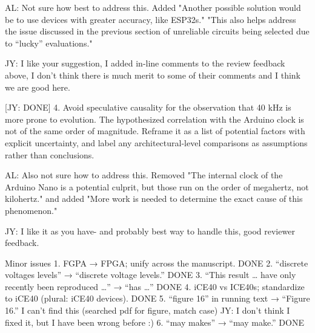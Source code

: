 AL: Not sure how best to address this. Added "Another possible solution would be to use devices with greater accuracy, like ESP32s." "This also helps address the issue discussed in the previous section of unreliable circuits being selected due to ``lucky'' evaluations."

JY: I like your suggestion, I added in-line comments to the review feedback above, I don't think there is much merit to some of their comments and I think we are good here.


[JY: DONE]
4. Avoid speculative causality for the observation that 40 kHz is more prone to evolution. The hypothesized correlation with the Arduino clock is not of the same order of magnitude. Reframe it as a list of potential factors with explicit uncertainty, and label any architectural-level comparisons as assumptions rather than conclusions.

AL: Also not sure how to address this. Removed "The internal clock of the Arduino Nano is a potential culprit, but those run on the order of megahertz, not kilohertz." and added "More work is needed to determine the exact cause of this phenomenon."

JY: I like it as you have- and probably best way to handle this, good reviewer feedback.

Minor issues
1. FGPA → FPGA; unify across the manuscript. DONE
2. “discrete voltages levels” → “discrete voltage levels.” DONE
3. “This result … have only recently been reproduced …” → “has …” DONE
4. iCE40 vs ICE40s; standardize to iCE40 (plural: iCE40 devices). DONE
5. “figure 16” in running text → “Figure 16.” I can't find this (searched pdf for figure, match case)
JY: I don't think I fixed it, but I have been wrong before :)
6. “may makes” → “may make.” DONE